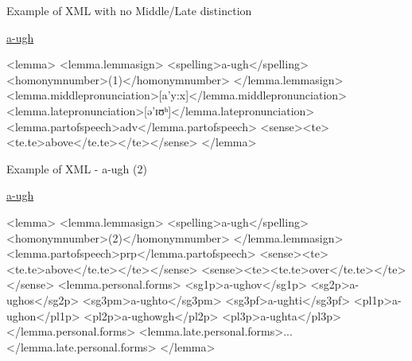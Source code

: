 \documentclass[handout]{beamer}
\begin{document}
\begin{frame}[fragile]{Example of XML with no Middle/Late distinction}
\begin{scriptsize}
\href{http://www.cornishdictionary.org.uk/?locale=en#a-ugh}{a-ugh}
\begin{semiverbatim}
\color{gray}
<lemma>
<lemma.lemmasign>
<spelling>{\color{black}a-ugh}</spelling>
<homonymnumber>{\color{black}(1)}</homonymnumber>
</lemma.lemmasign>
<lemma.middlepronunciation>[a'y:x]</lemma.middlepronunciation>
<lemma.latepronunciation>[ə'ɪʊʰ]</lemma.latepronunciation>
<lemma.partofspeech>{\color{black}adv}</lemma.partofspeech>
<sense><te><te.te>{\color{black}above}</te.te></te></sense>
</lemma>
\end{semiverbatim}
\end{scriptsize}
\end{frame}
\begin{frame}[fragile]{Example of XML - a-ugh (2)}
\begin{tiny}
\href{http://www.cornishdictionary.org.uk/?locale=en#a-ugh}{a-ugh}
\begin{semiverbatim}
\color{gray}
<lemma>
<lemma.lemmasign>
<spelling>{\color{black}a-ugh}</spelling>
<homonymnumber>{\color{black}(2)}</homonymnumber>
</lemma.lemmasign>
<lemma.partofspeech>{\color{black}prp}</lemma.partofspeech>
<sense><te><te.te>{\color{black}above}</te.te></te></sense>
<sense><te><te.te>{\color{black}over}</te.te></te></sense>
<lemma.personal.forms>
<sg1p>a-ughov</sg1p>
<sg2p>a-ughos</sg2p>
<sg3pm>a-ughto</sg3pm>
<sg3pf>a-ughti</sg3pf>
<pl1p>a-ughon</pl1p>
<pl2p>a-ughowgh</pl2p>
<pl3p>a-ughta</pl3p>
</lemma.personal.forms>
<lemma.late.personal.forms>...</lemma.late.personal.forms>
</lemma>
\end{semiverbatim}
\end{tiny}
\end{frame}
\end{document}
